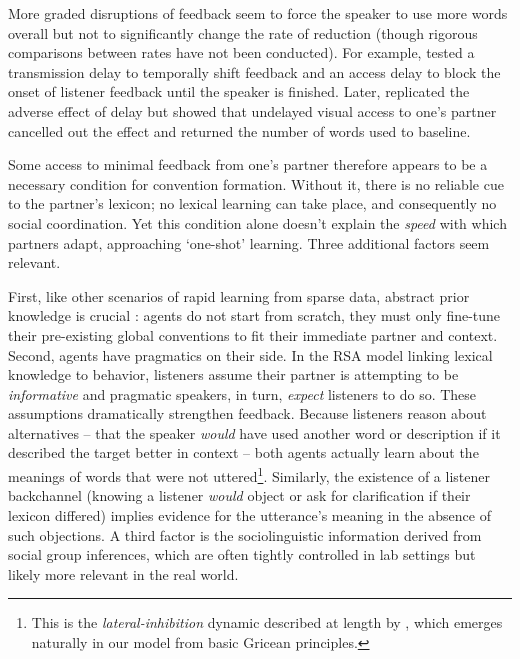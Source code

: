 \documentclass[11pt, floatsintext, jou]{apa6}
\begin{document}
More graded disruptions of feedback seem to force the speaker to use more words overall but not to significantly change the rate of reduction (though rigorous comparisons between rates have not been conducted). For example,  tested a transmission delay to temporally shift feedback and an access delay to block the onset of listener feedback until the speaker is finished. Later,  replicated the adverse effect of delay but showed that undelayed visual access to one's partner cancelled out the effect and returned the number of words used to baseline. 


Some access to minimal feedback from one's partner therefore appears to be a necessary condition for convention formation. Without it, there is no reliable cue to the partner's lexicon; no lexical learning can take place, and consequently no social coordination. Yet this condition alone doesn't explain the \emph{speed} with which partners adapt, approaching `one-shot' learning. Three additional factors seem relevant. 

First, like other scenarios of rapid learning from sparse data, abstract prior knowledge is crucial \cite{TenenbaumKempGriffithsGoodman11_Grow_a_Mind_Science,LakeEtAl16_BuildingMachines}: agents do not start from scratch, they must only fine-tune their pre-existing global conventions to fit their immediate partner and context. Second, agents have pragmatics on their side. In the RSA model linking lexical knowledge to behavior, listeners assume their partner is attempting to be \emph{informative} and pragmatic speakers, in turn, \emph{expect} listeners to do so. These assumptions dramatically strengthen feedback. Because listeners reason about alternatives -- that the speaker \emph{would} have used another word or description if it described the target better in context -- both agents actually learn about the meanings of words that were not uttered\footnote{
This is the \emph{lateral-inhibition} dynamic described at length by , which emerges naturally in our model from basic Gricean principles.
}. Similarly, the existence of a listener backchannel (knowing a listener \emph{would} object or ask for clarification if their lexicon differed) implies evidence for the utterance's meaning in the absence of such objections. A third factor is the sociolinguistic information derived from social group inferences, which are often tightly controlled in lab settings but likely more relevant in the real world. 
\end{document}
